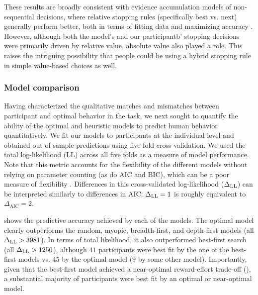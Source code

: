 These results are broadly consistent with evidence accumulation models of non-sequential decisions, where relative stopping rules (specifically best vs. next) generally perform better, both in terms of fitting data \citep{ratcliff2004comparison,teodorescu2013disentangling} and maximizing accuracy \citep{mcmillen2006dynamics,bogacz2006physics}. However, although both the model's and our participantb' stopping decisions were primarily driven by relative value, absolute value also played a role. This raises the intriguing possibility that people could be using a hybrid stopping rule in simple value-based choices as well.

\subsubsection{Model comparison}\label{sec:planning-comparison}
Having characterized the qualitative matches and mismatches between participant and optimal behavior in the task, we next sought to quantify the ability of the optimal and heuristic models to predict human behavior quantitatively.
%
We fit our models to participants at the individual level and obtained out-of-sample predictions using five-fold cross-validation. We used the total log-likelihood (LL) across all five folds as a measure of model performance. Note that this metric accounts for the flexibility of the different models without relying on parameter counting (as do AIC and BIC), which can be a poor measure of flexibility \citep{piantadosi2018one}. Differences in this cross-validated log-likelihood ($\Delta_{\mathrm{LL}}$) can be interpreted similarly to differences in AIC: $\Delta_{\mathrm{LL}} = 1$ is roughly equivalent to $\Delta_{\mathrm{AIC}} = 2$.

 shows the predictive accuracy achieved by each of the models. The optimal model clearly outperforms the random, myopic, breadth-first, and depth-first models (all $\Delta_{\mathrm{LL}} > 3981$). In terms of total likelihood, it also outperformed best-first search (all $\Delta_{\mathrm{LL}} > 1250$), although $41$ participants were best fit by the one of the best-first models vs. $45$ by the optimal model ($9$ by some other model). Importantly, given that the best-first model achieved a near-optimal reward-effort trade-off (), a substantial majority of participants were best fit by an optimal or near-optimal model.
%



